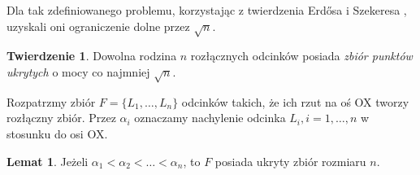 \documentclass[brudnopis]{xmgr}
\theoremstyle{definition}
\newtheorem{Twierdzenie}{Twierdzenie}
\newtheorem{Lemat}{Lemat}
\begin{document}
Dla tak zdefiniowanego problemu, korzystając z twierdzenia Erd{\H o}sa i Szekeresa \cite{erdosszekeres}, uzyskali oni ograniczenie dolne przez $\sqrt{n}$.

\begin{Twierdzenie}\label{moc zbioru ukrytego tw} \cite{illumination}
  Dowolna rodzina $n$ rozłącznych odcinków posiada \emph{zbiór punktów ukrytych} o mocy co najmniej $\sqrt{n}$.
\end{Twierdzenie}

Rozpatrzmy zbiór $F = \{L_1,\ldots,L_n\}$ odcinków takich, że ich rzut na oś OX tworzy rozłączny zbiór. Przez $\alpha_i$ oznaczamy nachylenie odcinka $L_i, i = 1,\ldots,n$ w stosunku do osi OX.
\begin{Lemat}\label{zbior ukryty} \cite{illumination}
  Jeżeli $\alpha_1 < \alpha_2 < \ldots < \alpha_n$, to $F$ posiada ukryty zbiór rozmiaru $n$.
\end{Lemat}
\end{document}
